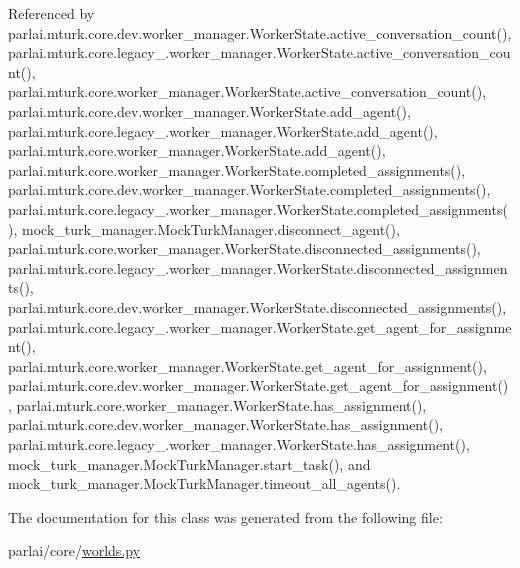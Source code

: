 Referenced by parlai.\+mturk.\+core.\+dev.\+worker\+\_\+manager.\+Worker\+State.\+active\+\_\+conversation\+\_\+count(), parlai.\+mturk.\+core.\+legacy\+\_.\+worker\+\_\+manager.\+Worker\+State.\+active\+\_\+conversation\+\_\+count(), parlai.\+mturk.\+core.\+worker\+\_\+manager.\+Worker\+State.\+active\+\_\+conversation\+\_\+count(), parlai.\+mturk.\+core.\+dev.\+worker\+\_\+manager.\+Worker\+State.\+add\+\_\+agent(), parlai.\+mturk.\+core.\+legacy\+\_.\+worker\+\_\+manager.\+Worker\+State.\+add\+\_\+agent(), parlai.\+mturk.\+core.\+worker\+\_\+manager.\+Worker\+State.\+add\+\_\+agent(), parlai.\+mturk.\+core.\+worker\+\_\+manager.\+Worker\+State.\+completed\+\_\+assignments(), parlai.\+mturk.\+core.\+dev.\+worker\+\_\+manager.\+Worker\+State.\+completed\+\_\+assignments(), parlai.\+mturk.\+core.\+legacy\+\_.\+worker\+\_\+manager.\+Worker\+State.\+completed\+\_\+assignments(), mock\+\_\+turk\+\_\+manager.\+Mock\+Turk\+Manager.\+disconnect\+\_\+agent(), parlai.\+mturk.\+core.\+worker\+\_\+manager.\+Worker\+State.\+disconnected\+\_\+assignments(), parlai.\+mturk.\+core.\+legacy\+\_.\+worker\+\_\+manager.\+Worker\+State.\+disconnected\+\_\+assignments(), parlai.\+mturk.\+core.\+dev.\+worker\+\_\+manager.\+Worker\+State.\+disconnected\+\_\+assignments(), parlai.\+mturk.\+core.\+legacy\+\_.\+worker\+\_\+manager.\+Worker\+State.\+get\+\_\+agent\+\_\+for\+\_\+assignment(), parlai.\+mturk.\+core.\+worker\+\_\+manager.\+Worker\+State.\+get\+\_\+agent\+\_\+for\+\_\+assignment(), parlai.\+mturk.\+core.\+dev.\+worker\+\_\+manager.\+Worker\+State.\+get\+\_\+agent\+\_\+for\+\_\+assignment(), parlai.\+mturk.\+core.\+worker\+\_\+manager.\+Worker\+State.\+has\+\_\+assignment(), parlai.\+mturk.\+core.\+dev.\+worker\+\_\+manager.\+Worker\+State.\+has\+\_\+assignment(), parlai.\+mturk.\+core.\+legacy\+\_.\+worker\+\_\+manager.\+Worker\+State.\+has\+\_\+assignment(), mock\+\_\+turk\+\_\+manager.\+Mock\+Turk\+Manager.\+start\+\_\+task(), and mock\+\_\+turk\+\_\+manager.\+Mock\+Turk\+Manager.\+timeout\+\_\+all\+\_\+agents().



The documentation for this class was generated from the following file\+:\begin{DoxyCompactItemize}
\item 
parlai/core/\hyperlink{parlai_2core_2worlds_8py}{worlds.\+py}\end{DoxyCompactItemize}
